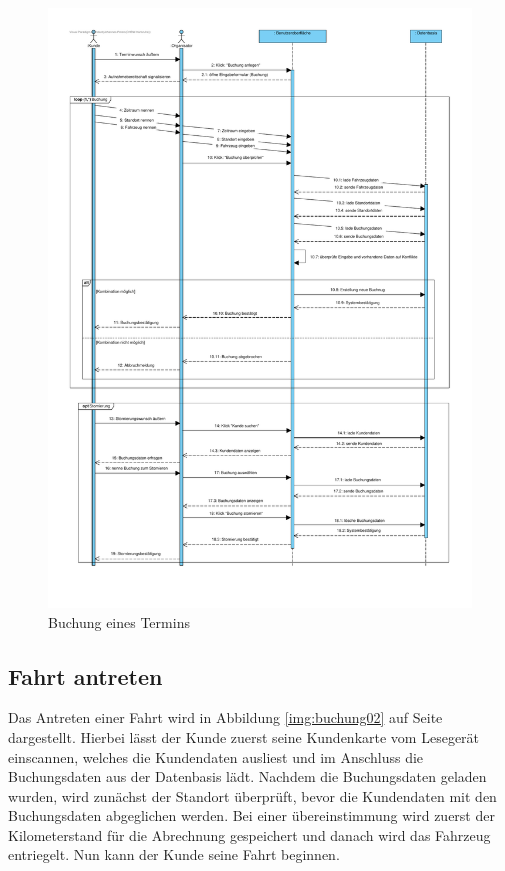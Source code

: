 \begin{figure}[!ht]
    \centering
    \includegraphics[width=\textwidth, height=\textheight-4cm]{Bilder/Diagramme/SD_Buchungsvorgang_01.pdf}
    \caption{Buchung eines Termins}
    \label{img:buchung01}
\end{figure}


\clearpage

\subsection{Fahrt antreten}

Das Antreten einer Fahrt wird in Abbildung \ref{img:buchung02} auf Seite \pageref{img:buchung02} dargestellt. Hierbei lässt der Kunde zuerst seine Kundenkarte vom Lesegerät einscannen, welches die Kundendaten ausliest und im Anschluss die Buchungsdaten aus der Datenbasis lädt. Nachdem die Buchungsdaten geladen wurden, wird zunächst der Standort überprüft, bevor die Kundendaten mit den Buchungsdaten abgeglichen werden. Bei einer übereinstimmung wird zuerst der Kilometerstand für die Abrechnung gespeichert und danach wird das Fahrzeug entriegelt. Nun kann der Kunde seine Fahrt beginnen. 


